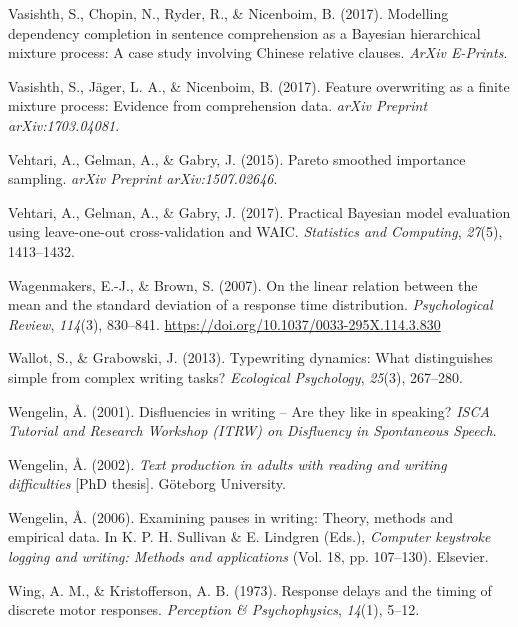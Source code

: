 \documentclass[
  english,
  man,mask,floatsintext]{apa7}
\newlength{\cslhangindent}
\newenvironment{cslreferences}%
  {\setlength{\parindent}{0pt}%
  \everypar{\setlength{\hangindent}{\cslhangindent}}\ignorespaces}%
  {\par}
\begin{document}
\begin{cslreferences}
\leavevmode\hypertarget{ref-vasishth2017}{}%
Vasishth, S., Chopin, N., Ryder, R., \& Nicenboim, B. (2017). Modelling dependency completion in sentence comprehension as a Bayesian hierarchical mixture process: A case study involving Chinese relative clauses. \emph{ArXiv E-Prints}.

\leavevmode\hypertarget{ref-vasishth2017feature}{}%
Vasishth, S., Jäger, L. A., \& Nicenboim, B. (2017). Feature overwriting as a finite mixture process: Evidence from comprehension data. \emph{arXiv Preprint arXiv:1703.04081}.

\leavevmode\hypertarget{ref-vehtari2015pareto}{}%
Vehtari, A., Gelman, A., \& Gabry, J. (2015). Pareto smoothed importance sampling. \emph{arXiv Preprint arXiv:1507.02646}.

\leavevmode\hypertarget{ref-vehtari2017practical}{}%
Vehtari, A., Gelman, A., \& Gabry, J. (2017). Practical Bayesian model evaluation using leave-one-out cross-validation and WAIC. \emph{Statistics and Computing}, \emph{27}(5), 1413--1432.

\leavevmode\hypertarget{ref-wagenmakers2007linear}{}%
Wagenmakers, E.-J., \& Brown, S. (2007). On the linear relation between the mean and the standard deviation of a response time distribution. \emph{Psychological Review}, \emph{114}(3), 830--841. \url{https://doi.org/10.1037/0033-295X.114.3.830}

\leavevmode\hypertarget{ref-wallot2013typewriting}{}%
Wallot, S., \& Grabowski, J. (2013). Typewriting dynamics: What distinguishes simple from complex writing tasks? \emph{Ecological Psychology}, \emph{25}(3), 267--280.

\leavevmode\hypertarget{ref-wengelin2001disfluencies}{}%
Wengelin, Å. (2001). Disfluencies in writing -- Are they like in speaking? \emph{ISCA Tutorial and Research Workshop (ITRW) on Disfluency in Spontaneous Speech}.

\leavevmode\hypertarget{ref-wen02}{}%
Wengelin, Å. (2002). \emph{Text production in adults with reading and writing difficulties} {[}PhD thesis{]}. Göteborg University.

\leavevmode\hypertarget{ref-wen06}{}%
Wengelin, Å. (2006). Examining pauses in writing: Theory, methods and empirical data. In K. P. H. Sullivan \& E. Lindgren (Eds.), \emph{Computer keystroke logging and writing: Methods and applications} (Vol. 18, pp. 107--130). Elsevier.

\leavevmode\hypertarget{ref-wing1973response}{}%
Wing, A. M., \& Kristofferson, A. B. (1973). Response delays and the timing of discrete motor responses. \emph{Perception \& Psychophysics}, \emph{14}(1), 5--12.


\end{cslreferences}
\end{document}
